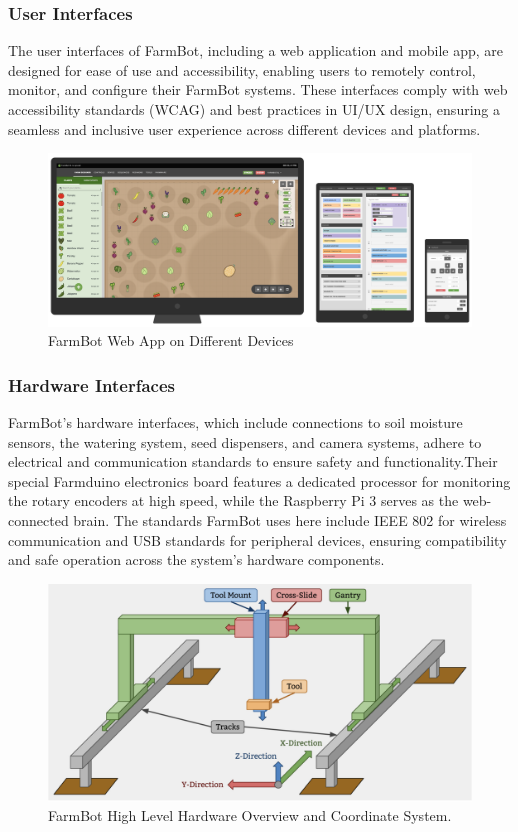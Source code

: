 \subsubsection{User Interfaces}
The user interfaces of FarmBot, including a web application and mobile app, are designed for ease of use and accessibility, enabling users to remotely control, monitor, and configure their FarmBot systems. These interfaces comply with web accessibility standards (WCAG) and best practices in UI/UX design, ensuring a seamless and inclusive user experience across different devices and platforms.

\begin{figure}[H]
    \centering
\includegraphics[scale=0.2]{./Figures/farmbot_ui.png}
\caption{FarmBot Web App on Different Devices}
\end{figure}

\subsubsection{Hardware Interfaces}
FarmBot's hardware interfaces, which include connections to soil moisture sensors, the watering system, seed dispensers, and camera systems, adhere to electrical and communication standards to ensure safety and functionality.Their special Farmduino electronics board features a dedicated processor for monitoring the rotary encoders at high speed, while the Raspberry Pi 3 serves as the web-connected brain. The standards FarmBot uses here include IEEE 802 for wireless communication and USB standards for peripheral devices, ensuring compatibility and safe operation across the system's hardware components.

\begin{figure}[H]
    \centering
\includegraphics[scale=0.3]{./Figures/farmbot_high_level_hardware.png}
\caption{FarmBot High Level Hardware Overview and Coordinate System.}
\end{figure}

